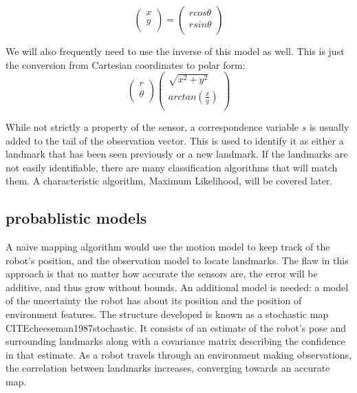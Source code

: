 \documentclass[12pt]{report}
\begin{document}
\begin{equation}\label{pol2cart}
\begin{pmatrix}
 x \\
 y \\
\end{pmatrix} =
\begin{pmatrix}
 r cos \theta \\
 r sin \theta  \\
\end{pmatrix}
\end{equation}

We will also frequently need to use the inverse of this model as well.  This is just the conversion from Cartesian coordinates to polar form:
\begin{equation}\label{cart2pol}
\begin{pmatrix}
 r \\
 \theta \\
\end{pmatrix}
\begin{pmatrix}
 \sqrt{x^2 + y^2}  \\
 arctan(\frac{x}{y}) \\
\end{pmatrix}
\end{equation}

While not strictly a property of the sensor, a correspondence variable $s$ is usually added to the tail of the observation vector.  This is used to identify it as either a landmark that has been seen previously or a new landmark.  If the landmarks are not easily identifiable, there are many classification algorithms that will match them.  A characteristic algorithm, Maximum Likelihood, will be covered later. 

\subsection{probablistic models}
A naive mapping algorithm would use the motion model to keep track of the robot's position, and the observation model to locate landmarks.  The flaw in this approach is that no matter how accurate the sensors are, the error will be additive, and thus grow without bounds.  An additional model is needed: a model of the uncertainty the robot has about its position and the position of environment features.  The structure developed is known as a stochastic map CITE{cheeseman1987stochastic}.  It consists of an estimate of the robot's pose and surrounding landmarks along with a covariance matrix describing the confidence in that estimate.  As a robot travels through an environment making observations, the correlation between landmarks increases, converging towards an accurate map.  
\end{document}
